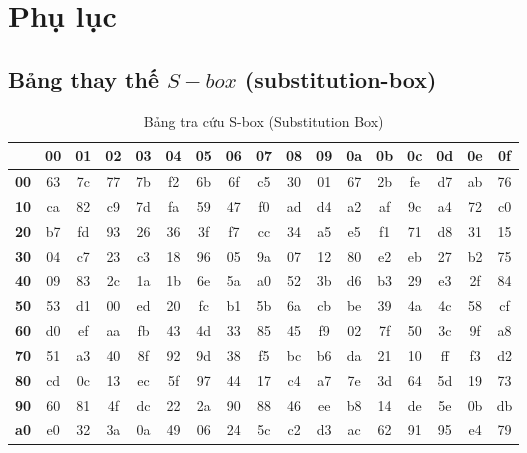 	\appendix
\section{Phụ lục}
\subsection{Bảng thay thế $S-box$ (substitution-box)}
\begin{table}[h!]
	\centering
	\caption{Bảng tra cứu S-box (Substitution Box)}
	\label{tab:sbox}
	
	\setlength{\tabcolsep}{3pt} %
	\begin{tabular}{|c|c|c|c|c|c|c|c|c|c|c|c|c|c|c|c|c|}
		\hline
		& \textbf{00} & \textbf{01} & \textbf{02} & \textbf{03} & \textbf{04} & \textbf{05} & \textbf{06} & \textbf{07} & \textbf{08} & \textbf{09} & \textbf{0a} & \textbf{0b} & \textbf{0c} & \textbf{0d} & \textbf{0e} & \textbf{0f} \\ \hline
		\textbf{00} & 63 & 7c & 77 & 7b & f2 & 6b & 6f & c5 & 30 & 01 & 67 & 2b & fe & d7 & ab & 76 \\ \hline
		\textbf{10} & ca & 82 & c9 & 7d & fa & 59 & 47 & f0 & ad & d4 & a2 & af & 9c & a4 & 72 & c0 \\ \hline
		\textbf{20} & b7 & fd & 93 & 26 & 36 & 3f & f7 & cc & 34 & a5 & e5 & f1 & 71 & d8 & 31 & 15 \\ \hline
		\textbf{30} & 04 & c7 & 23 & c3 & 18 & 96 & 05 & 9a & 07 & 12 & 80 & e2 & eb & 27 & b2 & 75 \\ \hline
		\textbf{40} & 09 & 83 & 2c & 1a & 1b & 6e & 5a & a0 & 52 & 3b & d6 & b3 & 29 & e3 & 2f & 84 \\ \hline
		\textbf{50} & 53 & d1 & 00 & ed & 20 & fc & b1 & 5b & 6a & cb & be & 39 & 4a & 4c & 58 & cf \\ \hline
		\textbf{60} & d0 & ef & aa & fb & 43 & 4d & 33 & 85 & 45 & f9 & 02 & 7f & 50 & 3c & 9f & a8 \\ \hline
		\textbf{70} & 51 & a3 & 40 & 8f & 92 & 9d & 38 & f5 & bc & b6 & da & 21 & 10 & ff & f3 & d2 \\ \hline
		\textbf{80} & cd & 0c & 13 & ec & 5f & 97 & 44 & 17 & c4 & a7 & 7e & 3d & 64 & 5d & 19 & 73 \\ \hline
		\textbf{90} & 60 & 81 & 4f & dc & 22 & 2a & 90 & 88 & 46 & ee & b8 & 14 & de & 5e & 0b & db \\ \hline
		\textbf{a0} & e0 & 32 & 3a & 0a & 49 & 06 & 24 & 5c & c2 & d3 & ac & 62 & 91 & 95 & e4 & 79 \\ \hline

\end{tabular}
\end{table}
